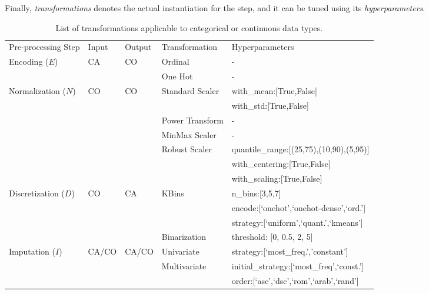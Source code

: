 Finally, \textit{transformations} denotes the actual instantiation for the step, and it can be tuned using its \textit{hyperparameters}.


\begin{table}[!t]
\renewcommand{\arraystretch}{0.3}
\footnotesize
\caption{List of transformations applicable to categorical or continuous data types.}
\centering
\begin{threeparttable}

\begin{tabular}{@{}p{30mm}lll>{\ttfamily}l@{}}
\toprule
Pre-processing Step& Input & Output & Transformation & \textnormal{Hyperparameters}
\\	\cmidrule[.1em]{1-5}

Encoding ($E$)  & CA & CO & Ordinal & -  \\ \cmidrule[.05em]{4-5} & & & One Hot & - \\
\cmidrule[.1em]{1-5}

Normalization ($N$) & CO & CO & Standard Scaler & with\_mean:[True,False]\\ \cmidrule[.05em]{4-5} & & & & with\_std:[True,False] \\ \cmidrule[.05em]{4-5}
&  &  & Power Transform & -\\ \cmidrule[.05em]{4-5}
&  &  & MinMax Scaler & -\\ \cmidrule[.05em]{4-5}
&  &  & Robust Scaler & quantile\_range:[(25,75),(10,90),(5,95)]\\ \cmidrule[.05em]{4-5} & & & & with\_centering:[True,False]\\ \cmidrule[.05em]{4-5} & & & & with\_scaling:[True,False] \\
\cmidrule[.1em]{1-5}

Discretization ($D$) & CO & CA & KBins & n\_bins:[3,5,7]\\ \cmidrule[.05em]{4-5} & & & & encode:[`onehot',`onehot-dense',`ord.']\\ \cmidrule[.05em]{4-5} & & & & strategy:[`uniform',`quant.',`kmeans']\\	\cmidrule[.05em]{4-5}
&  &  & Binarization  & threshold: [0, 0.5, 2, 5]\\	\cmidrule[.1em]{1-5}

Imputation ($I$) & CA/CO & CA/CO  & Univariate & strategy:[`most\_freq.','constant'] \\	\cmidrule[.05em]{4-5}
 & &  & Multivariate & initial\_strategy:[`most\_freq',`const.']\\ \cmidrule[.05em]{4-5} & & & & order:[`asc',`dsc',`rom',`arab',`rand'] \\	\cmidrule[.1em]{1-5}


\end{tabular}
\end{threeparttable}
\end{table}
